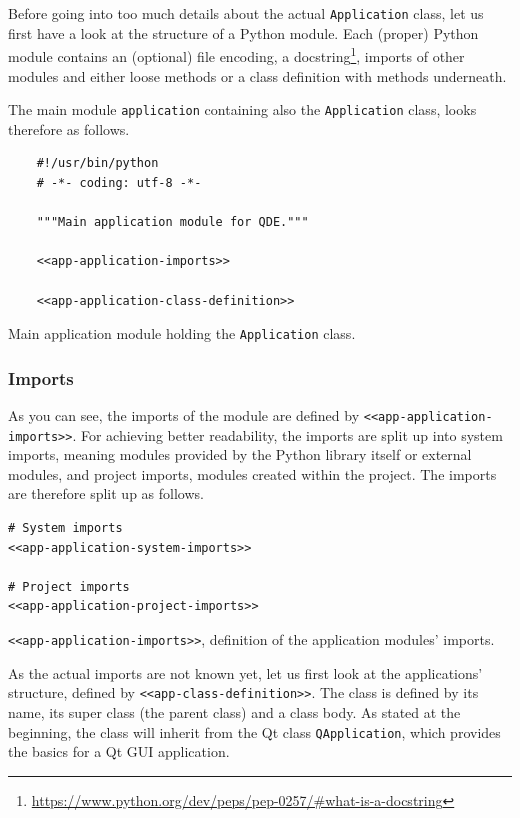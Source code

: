\documentclass[10pt, openright, notitlepage]{scrreprt}
\begin{document}
Before going into too much details about the actual \texttt{Application} class, let us
first have a look at the structure of a Python module. Each (proper) Python
module contains an (optional) file encoding, a
docstring\footnote{\url{https://www.python.org/dev/peps/pep-0257/\#what-is-a-docstring}},
imports of other modules and either loose methods or a class definition with
methods underneath.

The main module \texttt{application} containing also the \texttt{Application} class, looks
therefore as follows.

\begin{listing}[H]
\begin{verbatim}
    #!/usr/bin/python
    # -*- coding: utf-8 -*-
    
    """Main application module for QDE."""
    
    <<app-application-imports>>
    
    <<app-application-class-definition>>
\end{verbatim}
\caption{Main application module holding the \texttt{Application} class.}
\end{listing}

\subsubsection{Imports}
\label{sec:orgc25c0b8}
As you can see, the imports of the module are defined by \texttt{<<app-application-imports>>}. For
achieving better readability, the imports are split up into system imports,
meaning modules provided by the Python library itself or external modules, and
project imports, modules created within the project. The imports are therefore
split up as follows.

\begin{listing}[H]
\begin{verbatim}
# System imports
<<app-application-system-imports>>

# Project imports
<<app-application-project-imports>>
\end{verbatim}
\caption{\label{app-application-imports}
\texttt{<<app-application-imports>>}, definition of the application modules' imports.}
\end{listing}

As the actual imports are not known yet, let us first look at the applications'
structure, defined by \texttt{<<app-class-definition>>}. The class is defined by its
name, its super class (the parent class) and a class body. As stated at the
beginning, the class will inherit from the Qt class \texttt{QApplication}, which
provides the basics for a Qt GUI application.
\end{document}
